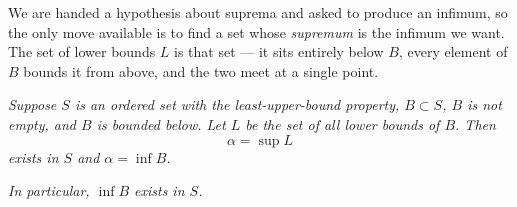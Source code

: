 \begin{unpack}
We are handed a hypothesis about suprema and asked to produce an infimum, so
the only move available is to find a set whose \emph{supremum} is the infimum we
want. The set of lower bounds $L$ is that set --- it sits entirely below $B$,
every element of $B$ bounds it from above, and the two meet at a single point.

\medskip
\begin{center}
\end{center}
\end{unpack}

\emph{Suppose $S$ is an ordered set with the least-upper-bound property,
$B \subset S$, $B$ is not empty, and $B$ is bounded below. Let $L$ be the set of
all lower bounds of $B$. Then}
\[ \alpha = \sup L \]
\emph{exists in $S$ and $\alpha = \inf B$.}

\emph{In particular, $\inf B$ exists in $S$.}

